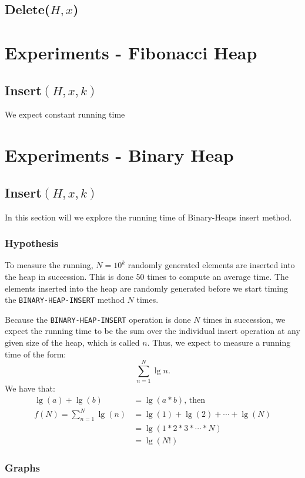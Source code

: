 \documentclass[a4paper,oneside,11pt]{article}
\begin{document}
\subsection*{Delete($H, x$)}

\section*{Experiments - Fibonacci Heap}
\subsection*{Insert$(H,x,k)$}
We expect constant running time 

\section*{Experiments - Binary Heap}
\subsection*{Insert$(H,x,k)$}
In this section will we explore the running time of Binary-Heaps insert method.
\subsubsection*{Hypothesis}
To measure the running, $N=10^k$ randomly generated elements are inserted into the heap in succession. This is done 50 times to compute an average time. The elements inserted into the heap are randomly generated before we start timing the \texttt{BINARY-HEAP-INSERT} method $N$ times.

Because the \texttt{BINARY-HEAP-INSERT} operation is done $N$ times in succession, we expect the running time to be the sum over the individual insert operation at any given size of the heap, which is called $n$.
Thus, we expect to measure a running time of the form: \[\sum^N_{n=1}\lg n.\]
We have that:
\begin{align*}
  \lg(a)+\lg(b)&=\lg(a*b)\text{, then}\\
  f(N)=\sum^N_{n=1}\lg(n)&=\lg(1)+\lg(2)+\cdots+\lg(N)\\
  &=\lg(1*2*3*\cdots *N)\\
  &=\lg(N!)
\end{align*}
\subsubsection*{Graphs}
\end{document}
